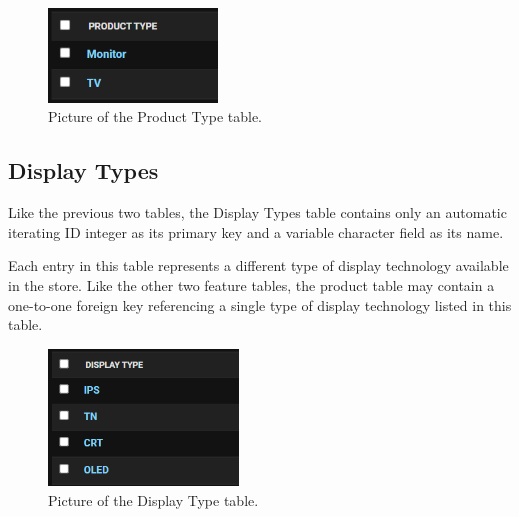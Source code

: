 \documentclass[sigconf]{acmart}
\begin{document}
\begin{figure}[H] %
	\centering %
	\includegraphics[width=0.4\textwidth]{Figures/producttype.png} %
	\caption{Picture of the Product Type table.}
\end{figure}

\subsection{Display Types}
Like the previous two tables, the Display Types table contains only an automatic iterating ID integer as its primary key and a variable character field as its name. \par
Each entry in this table represents a different type of display technology available in the store. Like the other two feature tables, the product table may contain a one-to-one foreign key referencing a single type of display technology listed in this table.

\begin{figure}[H] %
	\centering %
	\includegraphics[width=0.45\textwidth]{Figures/displaytypes.png} %
	\caption{Picture of the Display Type table.}
\end{figure}

\pagebreak
\end{document}

